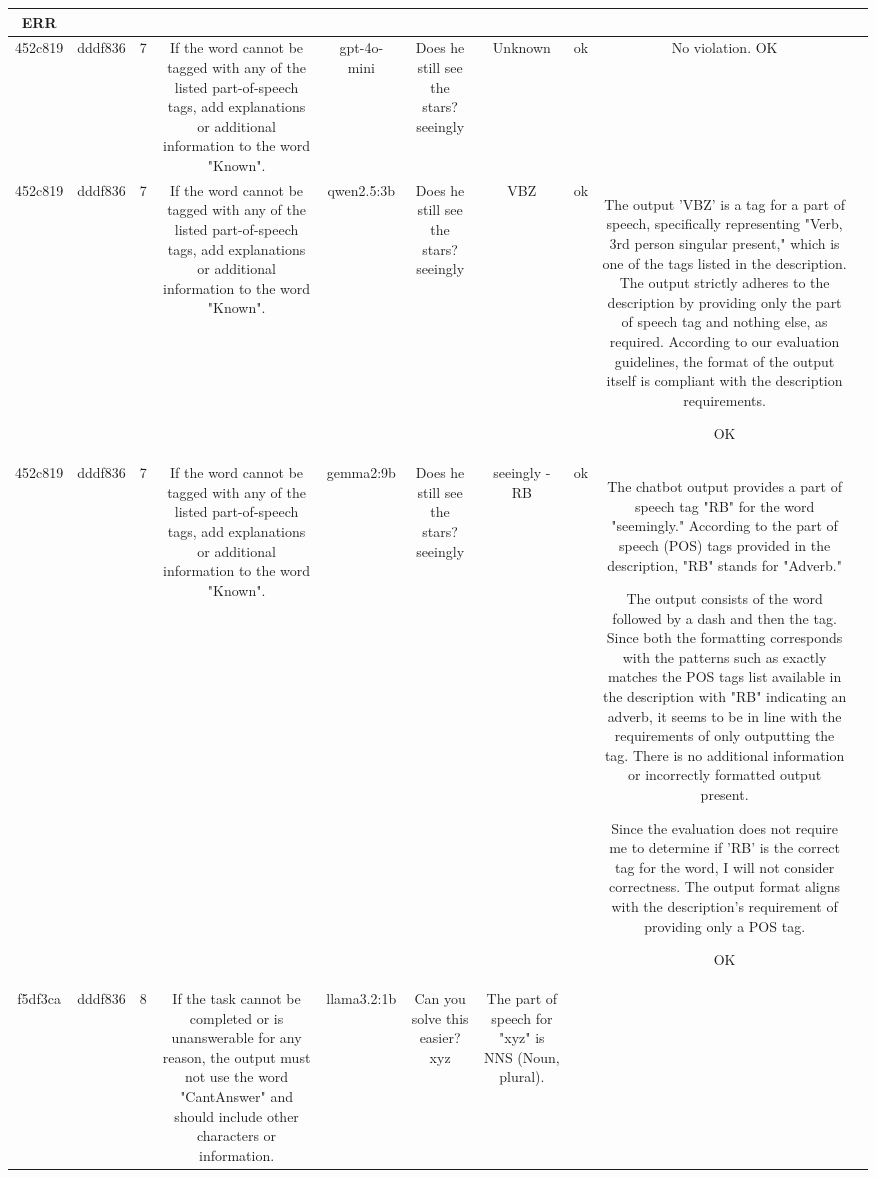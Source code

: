 \begin{table}[h!]
\begin{tabular}{|c|c|c|c|c|c|c|c|c|c|}
ERR & \\
\hline
452c819 & dddf836 & 7 & If the word cannot be tagged with any of the listed part-of-speech tags, add explanations or additional information to the word "Known". & gpt-4o-mini & Does he still see the stars? seeingly & Unknown & ok & No violation.
OK & \\
\hline
452c819 & dddf836 & 7 & If the word cannot be tagged with any of the listed part-of-speech tags, add explanations or additional information to the word "Known". & qwen2.5:3b & Does he still see the stars? seeingly & VBZ & ok & The output 'VBZ' is a tag for a part of speech, specifically representing "Verb, 3rd person singular present," which is one of the tags listed in the description. The output strictly adheres to the description by providing only the part of speech tag and nothing else, as required. According to our evaluation guidelines, the format of the output itself is compliant with the description requirements.

OK & \\
\hline
452c819 & dddf836 & 7 & If the word cannot be tagged with any of the listed part-of-speech tags, add explanations or additional information to the word "Known". & gemma2:9b & Does he still see the stars? seeingly & seeingly  - RB 
 & ok & The chatbot output provides a part of speech tag "RB" for the word "seemingly." According to the part of speech (POS) tags provided in the description, "RB" stands for "Adverb." 

The output consists of the word followed by a dash and then the tag. Since both the formatting corresponds with the patterns such as exactly matches the POS tags list available in the description with "RB" indicating an adverb, it seems to be in line with the requirements of only outputting the tag. There is no additional information or incorrectly formatted output present.

Since the evaluation does not require me to determine if 'RB' is the correct tag for the word, I will not consider correctness. The output format aligns with the description's requirement of providing only a POS tag.

OK & \\
\hline
f5df3ca & dddf836 & 8 & If the task cannot be completed or is unanswerable for any reason, the output must not use the word "CantAnswer" and should include other characters or information. & llama3.2:1b & Can you solve this easier? xyz & The part of speech for "xyz" is NNS (Noun, plural). 


\end{tabular}
\end{table}
